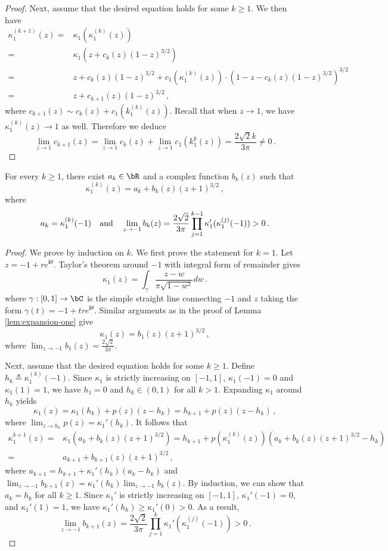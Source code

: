\documentclass[11pt]{article}
\newcommand{\g}{\kappa_1}
\renewcommand{\i}{\mathbf{i}}
\begin{document}
\begin{proof}
Next, assume that the desired equation holds for some $k\ge 1$. 
We then have \begin{align*}
    \g^{(k+1)}(z) ={}& \g(\g^{(k)}(z))\\
    ={}& \g(z+c_k(z)(1-z)^{3/2}) \\
    ={}& z + c_k(z)(1-z)^{3/2} + c_1\left(\g^{(k)}(z)\right)\cdot \left(1-z-c_k(z)(1-z)^{3/2}\right)^{3/2}\\
    ={}& z + c_{k+1}(z)(1-z)^{3/2}\,,
\end{align*}
where $c_{k+1}(z) \sim c_k(z) + c_1(k_1^{(k)}(z))$. Recall that when $ z\to 1$, we have $\g^{(k)}(z)\to 1$ as well. Therefore we deduce \[
\lim_{ z\to 1}c_{k+1}(z) = \lim_{ z\to 1} c_k(z) + \lim_{ z\to 1} c_1(k_1^{k}(z)) = \frac{2\sqrt{2}k}{3\pi} \ne 0\,.
\] 
\end{proof}


\begin{lemma}\label{lem:expansion-minus-one}
For every $k\ge 1$, there exist $a_k\in\bR$ and a complex function $b_k(z)$ such that \[\g^{(k)}(z) = a_k + b_k(z)(z+1)^{3/2}\,,\]
where \[a_k=\g^{(k)}(-1) ~~~{\rm and}~~~\lim_{z\to -1}b_k(z) = \frac{2\sqrt{2}}{3\pi} \prod_{j=1}^{k-1}\g'(\g^{(j)}(-1)) >0\,. \] 
\end{lemma}

\begin{proof}
We prove by induction on $k$. We first prove the statement for $k=1$. Let $z=-1+re^{\i\theta}$. Taylor's theorem around $-1$ with integral form of remainder gives \[
\g(z) = \int_\gamma \frac{z-w}{\pi\sqrt{1-w^2}}dw\,.
\]
where $\gamma:[0,1]\to\bC$ is the simple straight line connecting $-1$ and $z$ taking the form $\gamma(t)=-1+tre^{\i \theta}$. Similar arguments as in the proof of Lemma \ref{lem:expansion-one} give
\[\g(z)=b_1(z)(z+1)^{3/2}\,,\]
where $\lim_{z\to -1} b_1(z) = \frac{2\sqrt{2}}{3\pi} $.

Next, assume that the desired equation holds for some $k\geq 1$. Define $h_k\triangleq \g^{(k)}(-1)$. Since $\g$ is strictly increasing on $[-1,1]$,  $\g(-1)=0$ and $\g(1)=1$, we have $h_1 = 0$ and $h_k\in (0,1)$ for all $k>1$. Expanding $\g$ around $h_k$ yields
\[
\g(z) = \g(h_k) + p(z)(z-h_k) = h_{k+1} + p(z)(z-h_k)\,, 
\]
where $\lim_{z\to h_k}p(z)  = \g'(h_k)$. 
It follows that \begin{align*}
    \g^{k+1}(z) ={}& \g(a_k+b_k(z)(z+1)^{3/2}) 
    = h_{k+1} + p(\g^{(k)}(z))(a_k+b_k(z)(z+1)^{3/2}-h_k)\\
    ={}& a_{k+1} + b_{k+1}(z)(z+1)^{3/2}\,,
\end{align*}
where $a_{k+1} = h_{k+1} + \g'(h_k)(a_k-h_k)$ and $\lim_{z\to -1}b_{k+1}(z) = \g'(h_k)\lim_{z\to -1}b_k(z) $.
By induction, we can show that $a_k=h_k$ for all $k\ge 1$. 
Since $\g'$ is strictly increasing on $[-1,1]$, $\g'(-1)=0$, and $\g'(1)=1$, we have $\g'(h_k)\ge \g'(0)>0$. As a result, \[\lim_{z\to -1}b_{k+1}(z) = \frac{2\sqrt{2}}{3\pi} \prod_{j=1}^{k}\g'(\g^{(j)}(-1)) >0\,.\]

\end{proof}
\end{document}

